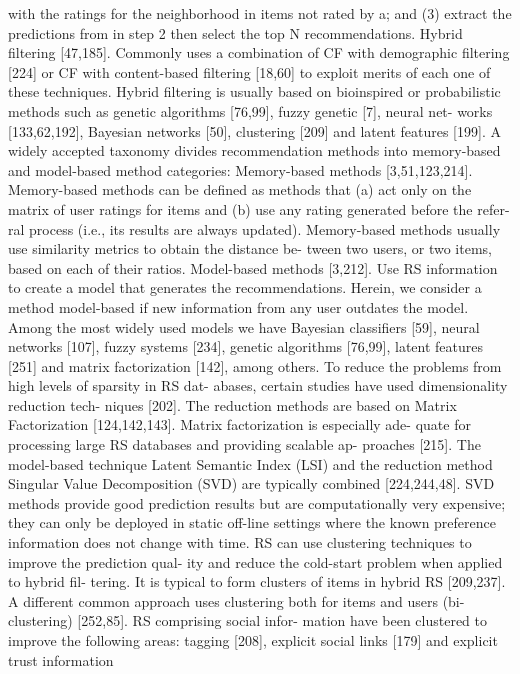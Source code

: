 \documentclass[11pt]{article}
\begin{document}
with the ratings for the neighborhood in items not rated by a; and
(3) extract the predictions from in step 2 then select the top N
recommendations.
Hybrid filtering [47,185]. Commonly uses a combination of CF
with demographic filtering [224] or CF with content-based filtering
[18,60] to exploit merits of each one of these techniques. Hybrid
filtering is usually based on bioinspired or probabilistic methods
such as genetic algorithms [76,99], fuzzy genetic [7], neural net-
works [133,62,192], Bayesian networks [50], clustering [209] and
latent features [199].
A widely accepted taxonomy divides recommendation methods
into memory-based and model-based method categories:
Memory-based methods [3,51,123,214]. Memory-based methods
can be defined as methods that (a) act only on the matrix of user
ratings for items and (b) use any rating generated before the refer-
ral process (i.e., its results are always updated). Memory-based
methods usually use similarity metrics to obtain the distance be-
tween two users, or two items, based on each of their ratios.
Model-based methods [3,212]. Use RS information to create a
model that generates the recommendations. Herein, we consider
a method model-based if new information from any user outdates
the model. Among the most widely used models we have Bayesian
classifiers [59], neural networks [107], fuzzy systems [234], genetic
algorithms [76,99], latent features [251] and matrix factorization
[142], among others.
To reduce the problems from high levels of sparsity in RS dat-
abases, certain studies have used dimensionality reduction tech-
niques [202]. The reduction methods are based on Matrix
Factorization [124,142,143]. Matrix factorization is especially ade-
quate for processing large RS databases and providing scalable ap-
proaches [215]. The model-based technique Latent Semantic Index
(LSI) and the reduction method Singular Value Decomposition
(SVD) are typically combined [224,244,48]. SVD methods provide
good prediction results but are computationally very expensive;
they can only be deployed in static off-line settings where the
known preference information does not change with time.
RS can use clustering techniques to improve the prediction qual-
ity and reduce the cold-start problem when applied to hybrid fil-
tering. It is typical to form clusters of items in hybrid RS
[209,237]. A different common approach uses clustering both for
items and users (bi-clustering) [252,85]. RS comprising social infor-
mation have been clustered to improve the following areas: tagging
[208], explicit social links [179] and explicit trust information
\end{document}
